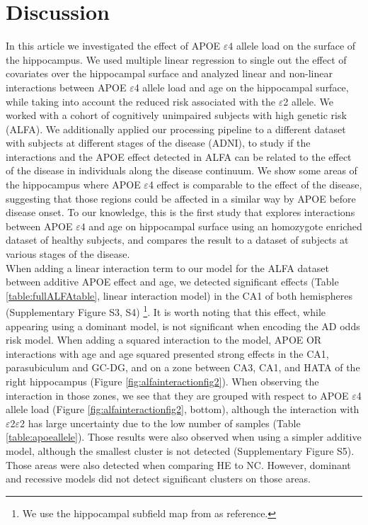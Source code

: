 \section{Discussion}
\label{sec:discussion}

In this article we investigated the effect of APOE $\varepsilon4$ allele load on the surface of the hippocampus. We used multiple linear regression to single out the effect of covariates over the hippocampal surface and analyzed linear and non-linear interactions between APOE $\varepsilon$4 allele load and age on the hippocampal surface, while taking into account the reduced risk associated with the $\varepsilon$2 allele. We worked with a cohort of cognitively unimpaired subjects with high genetic risk (ALFA). We additionally applied our processing pipeline to a different dataset with subjects at different stages of the disease (ADNI), to study if the interactions and the APOE effect detected in ALFA can be related to the effect of the disease in individuals along the disease continuum. We show some areas of the hippocampus where APOE $\varepsilon$4 effect is comparable to the effect of the disease, suggesting that those regions could be affected in a similar way by APOE before disease onset. To our knowledge, this is the first study that explores interactions between APOE $\varepsilon4$ and age on hippocampal surface using an homozygote enriched dataset of healthy subjects, and compares the result to a dataset of subjects at various stages of the disease. \\

When adding a linear interaction term to our model for the ALFA dataset between additive APOE effect and age, we detected significant effects (Table \ref{table:fullALFAtable}, linear interaction model) in the CA1 of both hemispheres (Supplementary Figure S3, S4) \footnote{We use the hippocampal subfield map from \cite{Iglesias2015} as reference.}. It is worth noting that this effect, while appearing using a dominant model, is not significant when encoding the AD odds risk model. When adding a squared interaction to the model, APOE OR interactions with age and age squared presented strong effects in the CA1, parasubiculum and GC-DG, and on a zone between CA3, CA1, and HATA of the right hippocampus (Figure \ref{fig:alfainteractionfig2}). When observing the interaction in those zones, we see that they are grouped with respect to APOE $\varepsilon$4 allele load (Figure \ref{fig:alfainteractionfig2}, bottom), although the interaction with $\varepsilon$2$\varepsilon$2 has large uncertainty due to the low number of samples (Table \ref{table:apoeallele}). Those results were also observed when using a simpler additive model, although the smallest cluster is not detected (Supplementary Figure S5). Those areas were also detected when comparing HE to NC. However, dominant and recessive models did not detect significant clusters on those areas. \\

